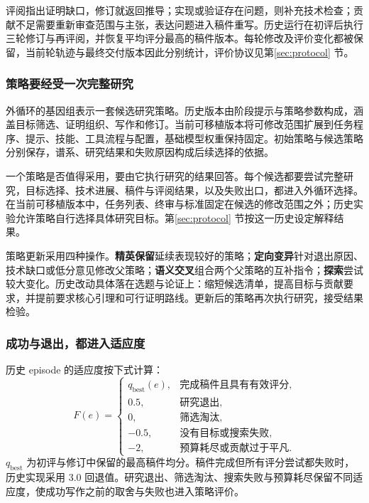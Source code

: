 评阅指出证明缺口，修订就返回推导；实现或验证存在问题，则补充技术检查；贡献不足需要重新审查范围与主张，表达问题进入稿件重写。历史运行在初评后执行三轮修订与再评阅，并恢复平均评分最高的稿件版本。每轮修改及评价变化都被保留，当前轮轨迹与最终交付版本因此分别统计，评价协议见第\ref{sec:protocol} 节。

\subsubsection{策略要经受一次完整研究}
外循环的基因组表示一套候选研究策略。历史版本由阶段提示与策略参数构成，涵盖目标筛选、证明组织、写作和修订。当前可移植版本将可修改范围扩展到任务程序、提示、技能、工具流程与配置，基础模型权重保持固定。初始策略与候选策略分别保存，谱系、研究结果和失败原因构成后续选择的依据。

一个策略是否值得采用，要由它执行研究的结果回答。每个候选都要尝试完整研究，目标选择、技术进展、稿件与评阅结果，以及失败出口，都进入外循环选择。在当前可移植版本中，任务列表、终审与标准固定在候选的修改范围之外；历史实验允许策略自行选择具体研究目标。第\ref{sec:protocol} 节按这一历史设定解释结果。

策略更新采用四种操作。\textbf{精英保留}延续表现较好的策略；\textbf{定向变异}针对退出原因、技术缺口或低分意见修改父策略；\textbf{语义交叉}组合两个父策略的互补指令；\textbf{探索}尝试较大变化。历史改动具体落在选题与论证上：缩短候选清单，提高目标与贡献要求，并提前要求核心引理和可行证明路线。更新后的策略再次执行研究，接受结果检验。

\subsubsection{成功与退出，都进入适应度}
历史 episode 的适应度按下式计算：
\begin{equation}
F(e)=\begin{cases}
q_{\mathrm{best}}(e),&\text{完成稿件且具有有效评分},\\
0.5,&\text{研究退出},\\
0,&\text{筛选淘汰},\\
-0.5,&\text{没有目标或搜索失败},\\
-2,&\text{预算耗尽或贡献过于平凡}.
\end{cases}
\label{eq:historical-fitness}
\end{equation}
$q_{\mathrm{best}}$ 为初评与修订中保留的最高稿件均分。稿件完成但所有评分尝试都失败时，历史实现采用 3.0 回退值。研究退出、筛选淘汰、搜索失败与预算耗尽保留不同适应度，使成功写作之前的取舍与失败也进入策略评价。

